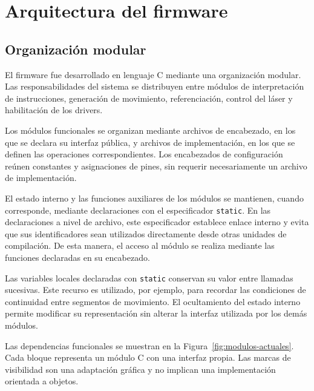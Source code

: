 \documentclass[blue,fullpaper]{ludusofficial}  %
\begin{document}
\clearpage

\section{Arquitectura del firmware}
\label{sec:arquitectura}

\subsection{Organización modular}

El firmware fue desarrollado en lenguaje C mediante
una organización modular. Las responsabilidades
del sistema se distribuyen entre módulos de
interpretación de instrucciones, generación
de movimiento, referenciación, control del láser
y habilitación de los drivers.

Los módulos funcionales se organizan mediante archivos
de encabezado, en los que se declara su interfaz pública,
y archivos de implementación, en los que se definen las
operaciones correspondientes. Los encabezados de
configuración reúnen constantes y asignaciones de pines,
sin requerir necesariamente un archivo de implementación.

El estado interno y las funciones auxiliares de los
módulos se mantienen, cuando corresponde, mediante
declaraciones con el especificador \texttt{static}.
En las declaraciones a nivel de archivo, este especificador
establece enlace interno y evita que sus identificadores
sean utilizados directamente desde otras unidades de
compilación. De esta manera, el acceso al módulo se realiza
mediante las funciones declaradas en su encabezado.

Las variables locales declaradas con \texttt{static}
conservan su valor entre llamadas sucesivas. Este recurso
es utilizado, por ejemplo, para recordar las condiciones
de continuidad entre segmentos de movimiento. El
ocultamiento del estado interno permite modificar su
representación sin alterar la interfaz utilizada por
los demás módulos.

Las dependencias funcionales se muestran en la Figura~\ref{fig:modulos-actuales}. Cada bloque representa un módulo C con una interfaz propia. Las marcas de visibilidad son una adaptación gráfica y no implican una implementación orientada a objetos. 


\end{document}
